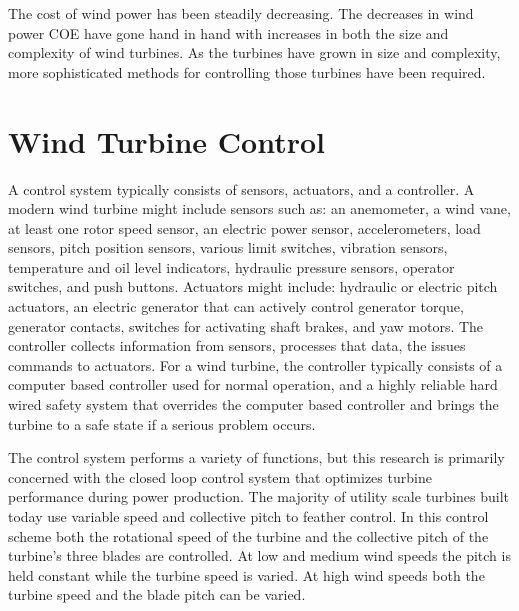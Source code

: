 The cost of wind power has been steadily decreasing.  The decreases in wind power COE have gone hand in hand with increases in both the size and complexity of wind turbines.  As the turbines have grown in size and complexity, more sophisticated methods for controlling those turbines have been required.  



\section{Wind Turbine Control} \label{section1-2} 

A control system typically consists of sensors, actuators, and a controller. A modern wind turbine might include sensors such as: an anemometer, a wind vane, at least one rotor speed sensor, an electric power sensor, accelerometers, load sensors, pitch position sensors, various limit switches, vibration sensors, temperature and oil level indicators, hydraulic pressure sensors, operator switches, and push buttons.  Actuators might include:  hydraulic or electric pitch actuators, an electric generator that can actively control generator torque, generator contacts, switches for activating shaft brakes, and yaw motors.  The controller collects information from sensors, processes that data, the issues commands to actuators. For a wind turbine, the controller typically consists of a computer based controller used for normal operation, and a highly reliable hard wired safety system that overrides the computer based controller and brings the turbine to a safe state if a serious problem occurs.\cite{burton2011}

The control system performs a variety of functions, but this research is primarily concerned with the closed loop control system that optimizes turbine performance during power production. The majority of utility scale turbines built today use variable speed and collective pitch to feather control.  In this control scheme both the rotational speed of the turbine and the collective pitch of the turbine’s three blades are controlled. At low and medium wind speeds the pitch is held constant while the turbine speed is varied.  At high wind speeds both the turbine speed and the blade pitch can be varied.

